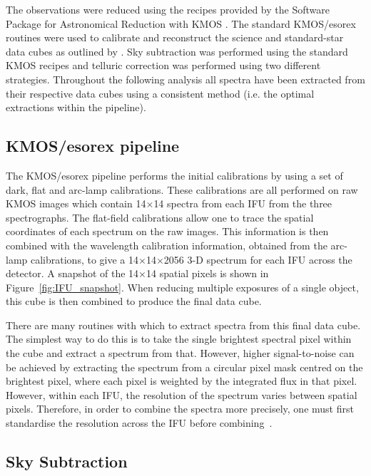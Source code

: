 The observations were reduced using the recipes provided by the Software Package for Astronomical Reduction with KMOS
\citep[SPARK;][]{2013A&A...558A..56D}.
The standard KMOS/esorex routines were used to calibrate and reconstruct the science and standard-star data cubes as outlined by
\cite{2013A&A...558A..56D}.
Sky subtraction was performed using the standard KMOS recipes and telluric correction was performed using two different strategies.
Throughout the following analysis all spectra have been extracted from their respective data cubes using a consistent method (i.e. the optimal extractions within the pipeline).

\subsection{KMOS/esorex pipeline} %
\label{sub:kmos_esorex_pipeline}

The KMOS/esorex pipeline performs the initial calibrations by using a set of dark, flat and arc-lamp calibrations.
These calibrations are all performed on raw KMOS images which contain 14$\times$14 spectra from each IFU from the three spectrographs.
The flat-field calibrations allow one to trace the spatial coordinates of each spectrum on the raw images.
This information is then combined with the wavelength calibration information,
obtained from the arc-lamp calibrations, to give a 14$\times$14$\times$2056 3-D spectrum for each IFU across the detector.
A snapshot of the 14$\times$14 spatial pixels is shown in Figure~\ref{fig:IFU_snapshot}.
When reducing multiple exposures of a single object, this cube is then combined to produce the final data cube.

There are many routines with which to extract spectra from this final data cube.
The simplest way to do this is to take the single brightest spectral pixel within the cube and extract a spectrum from that.
However, higher signal-to-noise can be achieved by extracting the spectrum from a circular pixel mask centred on the brightest pixel, where each pixel is weighted by the integrated flux in that pixel.
However, within each IFU, the resolution of the spectrum varies between spatial pixels.
Therefore, in order to combine the spectra more precisely, one must first standardise the resolution across the IFU before combining~\citep{2015ApJ...805..182G}.


\subsection{Sky Subtraction} %
\label{sub:sky_subtraction}


